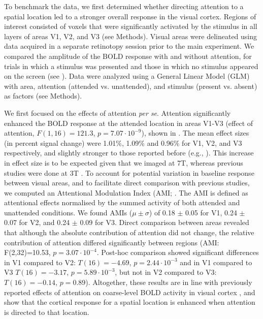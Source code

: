 \documentclass[9pt,lineno]{aperture}
\begin{document}
To benchmark the data, we first determined whether directing attention to a spatial location led to a stronger overall response in the visual cortex. Regions of interest consisted of voxels that were significantly activated by the stimulus in all layers of areas V1, V2, and V3 (see Methods). Visual areas were delineated using data acquired in a separate retinotopy session prior to the main experiment. We compared the amplitude of the BOLD response with and without attention, for trials in which a stimulus was presented and those in which no stimulus appeared on the screen (see ). Data were analyzed using a General Linear Model (GLM) with area, attention (attended vs. unattended), and stimulus (present vs. absent) as factors (see Methods).

We first focused on the effects of attention \emph{per se}. Attention significantly enhanced the BOLD response at the attended location in areas V1-V3 (effect of attention, $F(1,16)=121.3$, $p=7.07 \cdot 10^{-9}$), shown in . The mean effect sizes (in percent signal change) were 1.01\%, 1.09\% and 0.96\% for V1, V2, and V3 respectively, and slightly stronger to those reported before (e.g., \citet{Murray2008,Jehee2011,Sprague2013}). This increase in effect size is to be expected given that we imaged at 7T, whereas previous studies were done at 3T \citep{VanDerZwaag2009}. To account for potential variation in baseline response between visual areas, and to facilitate direct comparison with previous studies, we computed an Attentional Modulation Index (AMI; \citep{Kastner1999}. The AMI is defined as attentional effects normalised by the summed activity of both attended and unattended conditions. We found AMIs ($\mu \pm \sigma$) of 0.18 $\pm$ 0.05 for V1, 0.24 $\pm$ 0.07 for V2, and 0.24 $\pm$ 0.09 for V3. Direct comparison between areas revealed that although the absolute contribution of attention did not change, the relative contribution of attention differed significantly between regions (AMI: F(2,32)=10.53, $p=3.07 \cdot 10^{-4}$. Post-hoc comparison showed significant differences in V1 compared to V2: $T(16)=-4.69$, $p=2.44 \cdot 10^{-3}$ and in V1 compared to V3 $T(16)=-3.17$, $p=5.89 \cdot 10^{-3}$, but not in V2 compared to V3: $T(16)=-0.14$, $p=0.89$). Altogether, these results are  in line with previously reported effects of attention on coarse-level BOLD activity in visual cortex \citep{Somers1999,Gandhi1999}, and show that the cortical response for a spatial location is enhanced when attention is directed to that location.
\end{document}
